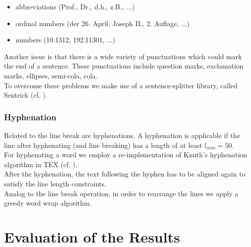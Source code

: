 \documentclass{reportAlternative}
\begin{document}
\begin{itemize}

	\item abbreviations (Prof., Dr., d.h., z.B., ...)
	
	\item ordinal numbers (der 26. April, Joseph II., 2. Auflage, ...)
	
	\item numbers (10.1312, 192.11301, ...)
	
\end{itemize}
Another issue is that there is a wide variety of punctuations which could mark the end of a sentence. These punctuations include question marks, exclamation marks, ellipses, semi-cola, cola.\\
To overcome these problems we make use of a sentence-splitter library, called Sentrick (cf. \cite{Sentrick}).


\subsection{Hyphenation}
 Related to the line break are hyphenations. A hyphenation is applicable if the line after hyphenating (and line breaking) has a length of at least $l_{min}=50$.\\ For hyphenating a word we employ a re-implementation of Knuth's hyphenation algorithm in TEX (cf. \cite{Hyphenation}). \\
After the hyphenation, the text following the hyphen has to be aligned again to satisfy the line length constraints.\\
Analog to the line break operation, in order to rearrange the lines we apply a greedy word wrap algorithm.













\chapter{Evaluation of the Results}

\end{document}
